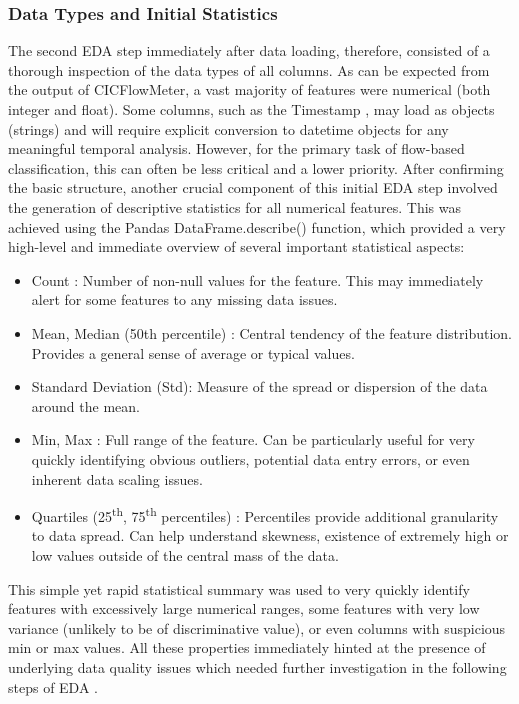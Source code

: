 \subsubsection{Data Types and Initial Statistics} 
The second EDA step immediately after data loading, therefore, consisted of a thorough inspection of the data types of all columns. As can be expected from the output of CICFlowMeter, a vast majority of features were numerical (both integer and float). Some columns, such as the Timestamp , may load as objects (strings) and will require explicit conversion to datetime objects for any meaningful temporal analysis. However, for the primary task of flow-based classification, this can often be less critical and a lower priority. After confirming the basic structure, another crucial component of this initial EDA step involved the generation of descriptive statistics for all numerical features. This was achieved using the Pandas DataFrame.describe() function, which provided a very high-level and immediate overview of several important statistical aspects:
\begin{itemize}[noitemsep] 
\item Count : Number of non-null values for the feature. This may immediately alert for some features to any missing data issues.
\item Mean, Median (50th percentile) : Central tendency of the feature distribution. Provides a general sense of average or typical values.
\item Standard Deviation (Std): Measure of the spread or dispersion of the data around the mean.
\item Min, Max : Full range of the feature. Can be particularly useful for very quickly identifying obvious outliers, potential data entry errors, or even inherent data scaling issues.
\item Quartiles (25\textsuperscript{th}, 75\textsuperscript{th} percentiles) : Percentiles provide additional granularity to data spread. Can help understand skewness, existence of extremely high or low values outside of the central mass of the data.
\end{itemize} 
This simple yet rapid statistical summary was used to very quickly identify features with excessively large numerical ranges, some features with very low variance (unlikely to be of discriminative value), or even columns with suspicious min or max values. All these properties immediately hinted at the presence of underlying data quality issues which needed further investigation in the following steps of EDA \parencite{kumar2021cicids}.

